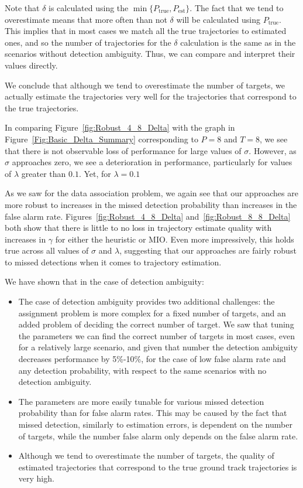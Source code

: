 Note that $\delta$ is calculated using the $\min\{P_{\text{true}},P_{\text{est}}\}$. The fact that we tend to overestimate means that more often than not $\delta$ will be calculated using $P_{\text{true}}$. This implies that in most cases we match all the true trajectories to estimated ones, and so the number of trajectories for the $\delta$ calculation is the same as in the scenarios without detection ambiguity. Thus, we can compare and interpret their values directly.

We conclude that although we tend to overestimate the number of targets, we actually estimate the trajectories very well for the trajectories that correspond to the true trajectories. 

In comparing Figure~\ref{fig:Robust_4_8_Delta} with the graph in Figure~\ref{Fig:Basic_Delta_Summary} corresponding to $P=8$ and $T=8$, we see that there is not observable loss of performance for large values of $\sigma$. However, as $\sigma$ approaches zero, we see a deterioration in performance, particularly for values of $\lambda$ greater than $0.1$. Yet, for $\lambda=0.1$ 





As we saw for the data association problem, we again see that our approaches are more robust to increases in the missed detection probability than increases in the false alarm rate. Figures~\ref{fig:Robust_4_8_Delta} and~\ref{fig:Robust_8_8_Delta} both show that there is little to no loss in trajectory estimate quality with increases in $\gamma$ for either the heuristic or MIO. Even more impressively, this holds true across all values of $\sigma$ and $\lambda$, suggesting that our approaches are fairly robust to missed detections when it comes to trajectory estimation.

We have shown that in the case of detection ambiguity:
\begin{itemize}
\item The case of detection ambiguity provides two additional challenges: the assignment problem is more complex for a fixed number of targets, and an added problem of deciding the correct number of target. We saw that tuning the parameters we can find the correct number of targets in most cases, even for a relatively large scenario, and given that number the detection ambiguity decreases performance by 5\%-10\%,  for the case of low false alarm rate and any detection probability, with respect to the same scenarios with no detection ambiguity.
\item The parameters are more easily tunable for various missed detection probability than for false alarm rates. This may be caused by the fact that missed detection, similarly to estimation errors, is dependent on the number of targets, while the number false alarm only depends on the false alarm rate. 
\item Although we tend to overestimate the number of targets, the quality of estimated trajectories that correspond to the true ground track trajectories is very high. 
\end{itemize}